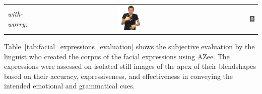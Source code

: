 \documentclass[../../main]{subfiles}
\begin{document}
\begin{longtable}{|l|c|r|}
    \emph{with-worry:} & \includegraphics[width=0.15\textwidth]{chapters/facial_expressions/images/original_facial_expressions/with_worry.png} & \includegraphics[width=0.15\textwidth]{chapters/facial_expressions/images/synthesized_expressions/with_worry.png} \\
\end{longtable}

Table~\ref{tab:facial_expressions_evaluation} shows the subjective evaluation by the linguist who created the corpus of the facial expressions using AZee. The expressions were assessed on isolated still images of the apex of their blendshapes based on their accuracy, expressiveness, and effectiveness in conveying the intended emotional and grammatical cues.
\end{document}

